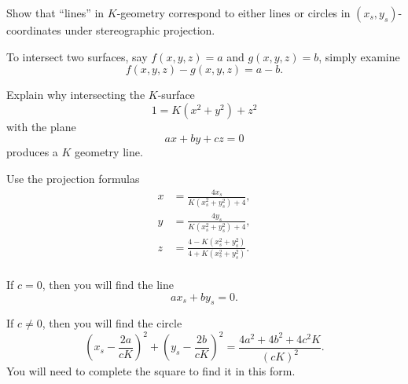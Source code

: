 \documentclass{ximera}
\begin{document}
\begin{problem}
  Show that ``lines'' in $K$-geometry correspond to either lines or
  circles in $(x_{s},y_{s})$-coordinates under stereographic
  projection.

\begin{hint}
  To intersect two surfaces, say $f(x,y,z)=a$ and $g(x,y,z)=b$,
  simply examine
  \[
  f(x,y,z)-g(x,y,z) = a-b.
  \]
\end{hint}

\begin{hint}
  Explain why intersecting the $K$-surface
  \[
  1 = K\left(x^2+y^2\right) + z^2 
  \]
  with the plane
  \[
  ax+by+cz = 0
  \]
  produces a $K$ geometry line.
\end{hint}

\begin{hint}
  Use the projection formulas
  \begin{align*}
      x &= \frac{4x_s}{K\left(x_s^2 + y_s^2\right) + 4},\\
      y &= \frac{4y_s}{K\left(x_s^2 + y_s^2\right) + 4},\\
      z &= \frac{4-K\left(x_s^2 + y_s^2\right)}{4+K\left(x_s^2 + y_s^2\right)}.\\
  \end{align*}
\end{hint}

\begin{hint}
  If $c=0$, then you will find the line
  \[
   ax_s + by_s = 0.
  \]
\end{hint}

\begin{hint}
  If $c\ne 0$, then you will find the circle
  \[
   \left(x_s - \frac{2a}{cK}\right)^2 + \left(y_s -
   \frac{2b}{cK}\right)^2 = \frac{4a^2 + 4b^2 + 4c^2K}{(cK)^2}.
   \]
   You will need to complete the square to find it in this form.
\end{hint}


\end{problem}
\end{document}
